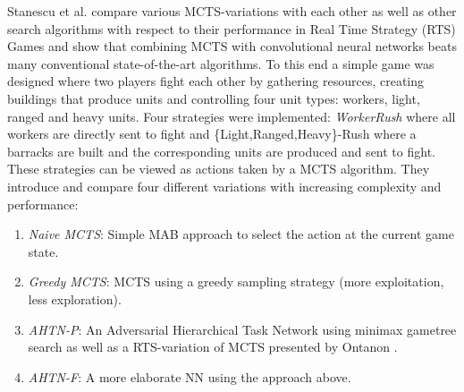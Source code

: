 Stanescu et al. \cite{stanescu2016evaluating} compare various MCTS-variations with each other as well as other search algorithms with respect to their performance in Real Time Strategy (RTS) Games and show that combining MCTS with convolutional neural networks beats many conventional state-of-the-art algorithms. To this end a simple game was designed where two players fight each other by gathering resources, creating buildings that produce units and controlling four unit types: workers, light, ranged and heavy units. Four strategies were implemented: \textit{WorkerRush} where all workers are directly sent to fight and \{Light,Ranged,Heavy\}-Rush where a barracks are built and the corresponding units are produced and sent to fight. These strategies can be viewed as actions taken by a MCTS algorithm. They introduce and compare four different variations with increasing complexity and performance:
\begin{enumerate}[label=\alph*)]
    \item \textit{Naive MCTS}: Simple MAB approach to select the action at the current game state.
    \item \textit{Greedy MCTS}: MCTS using a greedy sampling strategy (more exploitation, less exploration).
    \item \textit{AHTN-P}: An Adversarial Hierarchical Task Network using minimax gametree search as well as a RTS-variation of MCTS presented by Ontanon \cite{ontanon2013combinatorial}.
    \item \textit{AHTN-F}: A more elaborate NN using the approach above.
\end{enumerate}  
